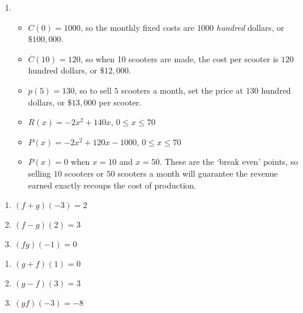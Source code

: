 \documentclass{ximera}
\begin{document}
\begin{enumerate}
\item  \begin{itemize}

\item  $C(0) = 1000$, so the monthly fixed costs are $1000$ \textit{hundred} dollars, or $\$100,\!000$.

\item  $\overline{C}(10) = 120$, so when 10 scooters are made, the cost per scooter is $120$ hundred dollars, or $\$12,\!000$.

\item  $p(5) = 130$, so to sell $5$ scooters a month, set the price at $130$ hundred dollars, or $\$13,\!000$ per scooter.

\item $R(x) = -2x^2+140x$, $0 \leq x \leq 70$

\item  $P(x) = -2x^2+120x-1000$, $0 \leq x \leq 70$

\item  $P(x) = 0$ when $x = 10$ and $x=50$.  These are the `break even' points, so selling $10$ scooters or $50$ scooters a month will guarantee the revenue earned exactly recoups the cost of production.

\end{itemize}

\setcounter{HW}{\value{enumi}}
\end{enumerate}

\begin{multicols}{3}
\begin{enumerate}
\setcounter{enumi}{\value{HW}}

\item $(f + g)(-3) = 2$
\item $(f - g)(2) = 3$
\item $(fg)(-1) = 0$

\setcounter{HW}{\value{enumi}}
\end{enumerate}
\end{multicols}

\begin{multicols}{3}
\begin{enumerate}
\setcounter{enumi}{\value{HW}}

\item $(g + f)(1) = 0$
\item $(g - f)(3) = 3$
\item $(gf)(-3) = -8$

\setcounter{HW}{\value{enumi}}
\end{enumerate}
\end{multicols}
\end{document}
